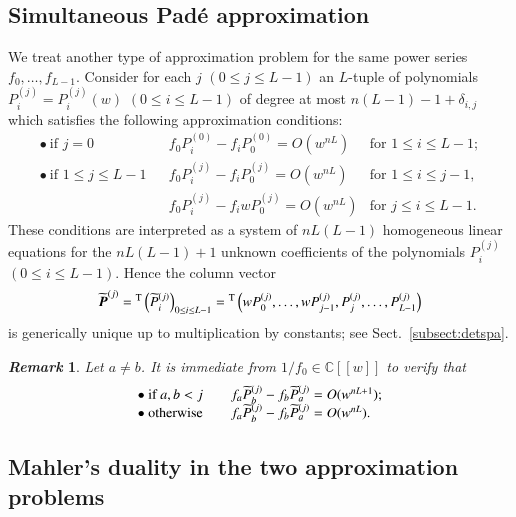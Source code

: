 \documentclass[12pt]{article}
\newtheorem{remark}[thm]{\it Remark}
\numberwithin{equation}{section}
\begin{document}
\subsection{Simultaneous Pad\'e approximation}
\label{subsect:spa}


We treat another type of approximation problem
for the same power series $f_0, \ldots,f_{L-1}$.
Consider for each $j$ $(0 \leq j \leq L-1)$ an $L$-tuple of polynomials 
$ P_i^{(j)}=P_i^{(j)}(w)$ $(0 \leq i \leq L-1)$
of degree at most $n (L-1)-1+\delta_{i,j}$
which satisfies
the following approximation conditions:
\begin{equation}  \label{eq:spa}
\begin{array}{llll}
\bullet \ \text{if $j=0$} &&
f_0 P_i^{(0)}-f_i  P_0^{(0)}=O(w^{nL}) & \text{for $1 \leq i\leq L-1$};
\\ 
\bullet \ \text{if $1 \leq  j \leq L-1$} &&
f_0 P_i^{(j)}-f_i  P_0^{(j)}=O(w^{nL}) & \text{for $1 \leq i \leq j-1$},
\\
&&
f_0 P_i^{(j)}-f_i w P_0^{(j)}=O(w^{nL}) & \text{for $j \leq i \leq L-1$}.
\end{array}
\end{equation}
These conditions
are interpreted as 
a system of  $n L(L-1)$  homogeneous linear equations
for the $n L(L-1)+1$
unknown coefficients of the polynomials $P_i^{(j)}$
$(0 \leq i \leq L-1)$.
Hence 
the column vector
\begin{align*}
 \widetilde{\boldsymbol P}^{(j)}
 ={}^{\rm T}\left( \widetilde{P}_i^{(j)} \right)_{0 \leq i \leq L-1}
={}^{\rm T}\left( w P_0^{(j)}, \ldots , w P_{j-1}^{(j)}, P_{j}^{(j)},  \ldots ,P_{L-1}^{(j)} \right)
\end{align*}
is generically unique up to multiplication by constants;
see Sect.~\ref{subsect:detspa}. 


\begin{remark}\rm
Let $a \neq b$.
It is immediate from $1/f_0 \in {\mathbb C}[\![w] \!]$
to verify that
  \[
 \begin{array}{lll}
 \bullet \ \text{\rm if $a, b <j$} &&
 f_a \widetilde{P}_b^{(j)} - f_b \widetilde{P}_a^{(j)} =O(w^{nL+1});
 \\
  \bullet \ \text{\rm otherwise} &&
  f_a \widetilde{P}_b^{(j)} - f_b\widetilde{P}_a^{(j)} =O(w^{nL}).
 \end{array}
 \]
\end{remark}




\subsection{Mahler's duality in the two approximation problems}
\label{subsect:dual}
\end{document}
